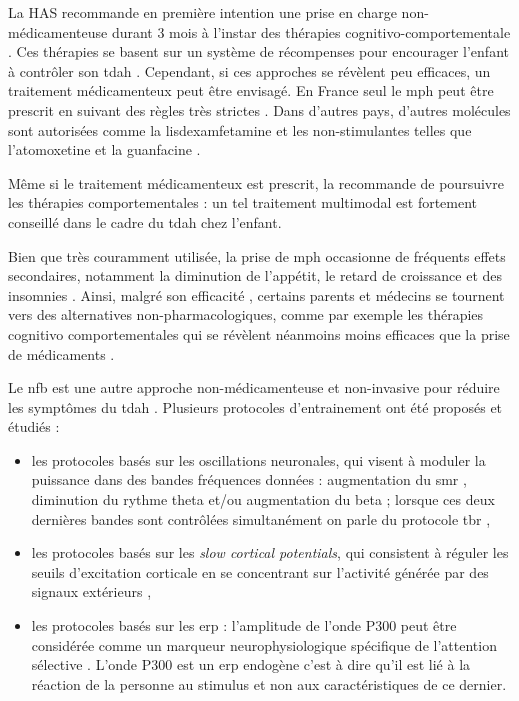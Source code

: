 La HAS recommande en première intention une prise en charge non-médicamenteuse durant 3 mois à l'instar des thérapies cognitivo-comportementale \citep{HAS}. 
Ces thérapies se basent sur un système de récompenses pour encourager l'enfant à contrôler son \gls{tdah} \citep{Evans2011, Sonuga2004}.
Cependant, si ces approches se révèlent peu efficaces, un traitement médicamenteux peut être envisagé. En France seul le \gls{mph}
peut être prescrit en suivant des règles très strictes \citep{HAS}. Dans d'autres pays, d'autres molécules sont autorisées comme la lisdexamfetamine et 
les non-stimulantes telles que l'atomoxetine et la guanfacine \citep{Luan2017}.

Même si le traitement médicamenteux est prescrit, la \citet{HAS} recommande de poursuivre les thérapies comportementales : un tel traitement multimodal 
est fortement conseillé dans le cadre du \gls{tdah} chez l'enfant.

Bien que très couramment utilisée,  la prise de \gls{mph} occasionne de fréquents effets secondaires,
notamment la diminution de l'appétit, le retard de croissance et des insomnies \citep{Sousa2012}. Ainsi, malgré son efficacité \citep{Taylor2014,
Storebo2015, Swanson2017}, certains parents et médecins se tournent vers des alternatives non-pharmacologiques, comme par exemple les thérapies cognitivo 
comportementales \citep{Berger2008} qui se révèlent néanmoins
moins efficaces que la prise de médicaments \citep{Sonuga-Barke2013}. 

Le \gls{nfb} est une autre approche non-médicamenteuse et non-invasive pour réduire les symptômes du \gls{tdah} \citep{Arns2015, Marzbani2016}.  
Plusieurs protocoles d'entrainement ont été proposés et étudiés :
\begin{itemize}
\item les protocoles basés sur les oscillations neuronales, qui visent à moduler la puissance dans des bandes fréquences données : augmentation du 
\gls{smr} \citep{Beauregard2006}, diminution du rythme theta et/ou augmentation du beta \citep{Arns2015, Kropotov2005} ; lorsque ces deux dernières 
bandes sont contrôlées simultanément on parle du protocole \gls{tbr} \citep{Lubar1976, Arns2013}, 
\item les protocoles basés sur les \textit{slow cortical potentials}, qui consistent à réguler les seuils d'excitation corticale en se concentrant sur l'activité 
générée par des signaux extérieurs \citep{Heinrich2004, Banaschewski2007},
\item les protocoles basés sur les \gls{erp} : l'amplitude de l'onde P300 peut être considérée comme un marqueur neurophysiologique spécifique de l'attention 
sélective \citep{Fouillen2017}. L'onde P300 est un \gls{erp} endogène c'est à dire qu'il est lié à la réaction de la personne au stimulus et non aux caractéristiques de ce dernier.
\end{itemize}

